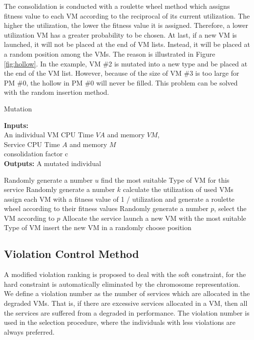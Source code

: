 The consolidation is conducted with a roulette wheel method which assigns fitness value to each VM according to the reciprocal of its current utilization. 
The higher the utilization, the lower the fitness value
it is assigned. 
Therefore, a lower utilization VM has a greater probability to be chosen. 
At last, if a new VM is launched, it will not be placed at the end of VM lists. Instead, it will be placed at a random position among the VMs. The reason is illustrated in Figure \ref{fig:hollow}. In the example, VM \#2 is mutated into a new type and be placed at the end of the VM list. However, because of the size of VM \#3 is too large for PM \#0, the hollow in PM \#0 will never be filled. This problem can be solved with the random insertion method.
\begin{algorithm}[!htb]
 \caption{Mutation}
 \footnotesize
 \textbf{Inputs:} \\
  An individual
  VM CPU Time $VA$ and memory $VM$, \\
  Service CPU Time $A$ and memory $M$ \\
  consolidation factor c \\
 \textbf{Outputs:}
  A mutated individual

 \begin{algorithmic}[1]
    \STATE Randomly generate a number $u$
      \STATE find the most suitable Type of VM for this service
      \STATE Randomly generate a number $k$
        \STATE calculate the utilization of used VMs
        \STATE assign each VM with a fitness value of 1 / utilization and generate a roulette wheel
            according to their fitness values
        \STATE Randomly generate a number $p$, select the VM according to $p$
        \STATE Allocate the service
      \ELSE
        \STATE launch a new VM with the most suitable Type of VM 
        \STATE insert the new VM in a randomly choose position
      \ENDIF
    \ENDIF
  \ENDFOR
 \end{algorithmic}
 \label{alg:mutation}
\end{algorithm}

\subsection{Violation Control Method}
A modified violation ranking is proposed to deal with the soft constraint, for the hard constraint is automatically eliminated by the chromosome representation.
We define a violation number as the number of services which are allocated in the degraded VMs. 
That is, if there are excessive services allocated in a VM, then all the services are suffered from a degraded in performance. 
The violation number is used in the selection procedure, 
where the individuals with less violations are always preferred.

